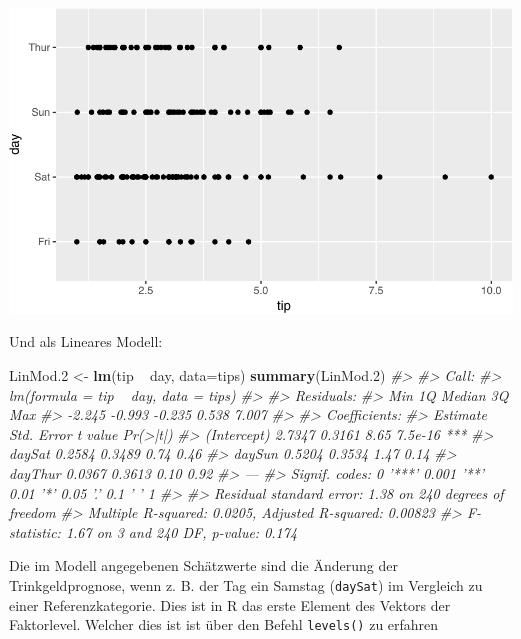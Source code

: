 \documentclass[12pt,]{book}
\newenvironment{Shaded}{\begin{snugshade}}{\end{snugshade}}
\newcommand{\KeywordTok}[1]{\textcolor[rgb]{0.13,0.29,0.53}{\textbf{{#1}}}}
\newcommand{\DataTypeTok}[1]{\textcolor[rgb]{0.13,0.29,0.53}{{#1}}}
\newcommand{\FloatTok}[1]{\textcolor[rgb]{0.00,0.00,0.81}{{#1}}}
\newcommand{\StringTok}[1]{\textcolor[rgb]{0.31,0.60,0.02}{{#1}}}
\newcommand{\CommentTok}[1]{\textcolor[rgb]{0.56,0.35,0.01}{\textit{{#1}}}}
\newcommand{\NormalTok}[1]{{#1}}
\begin{document}
\begin{center}\includegraphics[width=0.7\linewidth]{071_Regression_files/figure-latex/unnamed-chunk-11-1} \end{center}

Und als Lineares Modell:

\begin{Shaded}
\begin{Highlighting}[]
\NormalTok{LinMod}\FloatTok{.2} \NormalTok{<-}\StringTok{ }\KeywordTok{lm}\NormalTok{(tip ~}\StringTok{ }\NormalTok{day, }\DataTypeTok{data=}\NormalTok{tips)}
\KeywordTok{summary}\NormalTok{(LinMod}\FloatTok{.2}\NormalTok{)}
\CommentTok{#> }
\CommentTok{#> Call:}
\CommentTok{#> lm(formula = tip ~ day, data = tips)}
\CommentTok{#> }
\CommentTok{#> Residuals:}
\CommentTok{#>    Min     1Q Median     3Q    Max }
\CommentTok{#> -2.245 -0.993 -0.235  0.538  7.007 }
\CommentTok{#> }
\CommentTok{#> Coefficients:}
\CommentTok{#>             Estimate Std. Error t value Pr(>|t|)    }
\CommentTok{#> (Intercept)   2.7347     0.3161    8.65  7.5e-16 ***}
\CommentTok{#> daySat        0.2584     0.3489    0.74     0.46    }
\CommentTok{#> daySun        0.5204     0.3534    1.47     0.14    }
\CommentTok{#> dayThur       0.0367     0.3613    0.10     0.92    }
\CommentTok{#> ---}
\CommentTok{#> Signif. codes:  0 '***' 0.001 '**' 0.01 '*' 0.05 '.' 0.1 ' ' 1}
\CommentTok{#> }
\CommentTok{#> Residual standard error: 1.38 on 240 degrees of freedom}
\CommentTok{#> Multiple R-squared:  0.0205, Adjusted R-squared:  0.00823 }
\CommentTok{#> F-statistic: 1.67 on 3 and 240 DF,  p-value: 0.174}
\end{Highlighting}
\end{Shaded}

Die im Modell angegebenen Schätzwerte sind die Änderung der
Trinkgeldprognose, wenn z. B. der Tag ein Samstag (\texttt{daySat}) im
Vergleich zu einer Referenzkategorie. Dies ist in R das erste Element
des Vektors der Faktorlevel. Welcher dies ist ist über den Befehl
\texttt{levels()} zu erfahren
\end{document}
